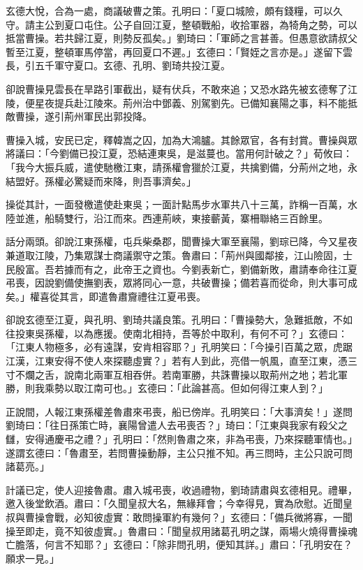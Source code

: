玄德大悅，合為一處，商議破曹之策。孔明曰：「夏口城險，頗有錢糧，可以久守。請主公到夏口屯住。公子自回江夏，整頓戰船，收拾軍器，為犄角之勢，可以抵當曹操。若共歸江夏，則勢反孤矣。」劉琦曰：「軍師之言甚善。但愚意欲請叔父暫至江夏，整頓軍馬停當，再回夏口不遲。」玄德曰：「賢姪之言亦是。」遂留下雲長，引五千軍守夏口。玄德、孔明、劉琦共投江夏。

卻說曹操見雲長在旱路引軍截出，疑有伏兵，不敢來追；又恐水路先被玄德奪了江陵，便星夜提兵赴江陵來。荊州治中鄧義、別駕劉先。已備知襄陽之事，料不能抵敵曹操，遂引荊州軍民出郭投降。

曹操入城，安民已定，釋韓嵩之囚，加為大鴻臚。其餘眾官，各有封賞。曹操與眾將議曰：「今劉備已投江夏，恐結連東吳，是滋蔓也。當用何計破之？」荀攸曰：「我今大振兵威，遣使馳檄江東，請孫權會獵於江夏，共擒劉備，分荊州之地，永結盟好。孫權必驚疑而來降，則吾事濟矣。」

操從其計，一面發檄遣使赴東吳；一面計點馬步水軍共八十三萬，詐稱一百萬，水陸並進，船騎雙行，沿江而來。西連荊峽，東接蘄黃，寨柵聯絡三百餘里。

話分兩頭。卻說江東孫權，屯兵柴桑郡，聞曹操大軍至襄陽，劉琮已降，今又星夜兼道取江陵，乃集眾謀士商議禦守之策。魯肅曰：「荊州與國鄰接，江山險固，士民殷富。吾若據而有之，此帝王之資也。今劉表新亡，劉備新敗，肅請奉命往江夏弔喪，因說劉備使撫劉表，眾將同心一意，共破曹操；備若喜而從命，則大事可成矣。」權喜從其言，即遣魯肅齎禮往江夏弔喪。

卻說玄德至江夏，與孔明、劉琦共議良策。孔明曰：「曹操勢大，急難抵敵，不如往投東吳孫權，以為應援。使南北相持，吾等於中取利，有何不可？」玄德曰：「江東人物極多，必有遠謀，安肯相容耶？」孔明笑曰：「今操引百萬之眾，虎踞江漢，江東安得不使人來探聽虛實？」若有人到此，亮借一帆風，直至江東，憑三寸不爛之舌，說南北兩軍互相吞併。若南軍勝，共誅曹操以取荊州之地；若北軍勝，則我乘勢以取江南可也。」玄德曰：「此論甚高。但如何得江東人到？」

正說間，人報江東孫權差魯肅來弔喪，船已傍岸。孔明笑曰：「大事濟矣！」遂問劉琦曰：「往日孫策亡時，襄陽曾遣人去弔喪否？」琦曰：「江東與我家有殺父之讎，安得通慶弔之禮？」孔明曰：「然則魯肅之來，非為弔喪，乃來探聽軍情也。」遂謂玄德曰：「魯肅至，若問曹操動靜，主公只推不知。再三問時，主公只說可問諸葛亮。」

計議已定，使人迎接魯肅。肅入城弔喪，收過禮物，劉琦請肅與玄德相見。禮畢，邀入後堂飲酒。肅曰：「久聞皇叔大名，無緣拜會；今幸得見，實為欣慰。近聞皇叔與曹操會戰，必知彼虛實：敢問操軍約有幾何？」玄德曰：「備兵微將寡，一聞操至即走，竟不知彼虛實。」魯肅曰：「聞皇叔用諸葛孔明之謀，兩場火燒得曹操魂亡膽落，何言不知耶？」玄德曰：「除非問孔明，便知其詳。」肅曰：「孔明安在？願求一見。」

